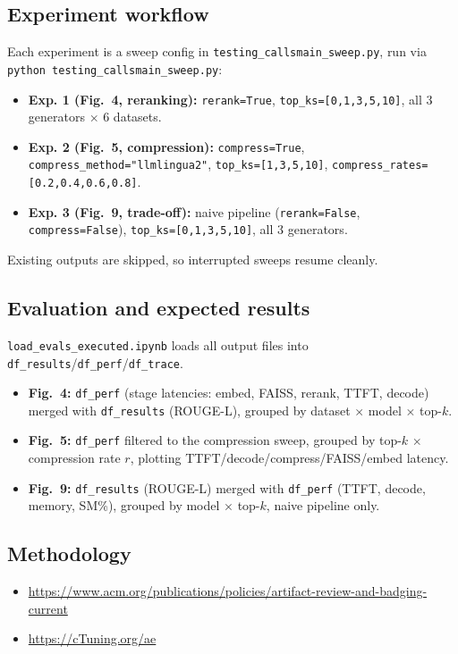 \subsection{Experiment workflow}
Each experiment is a sweep config in \texttt{testing\_callsmain\_sweep.py},
run via \texttt{python testing\_callsmain\_sweep.py}:

\begin{itemize}
  \item {\bf Exp. 1 (Fig.~4, reranking): } \texttt{rerank=True}, \texttt{top\_ks=[0,1,3,5,10]}, all 3 generators $\times$ 6 datasets.
  \item {\bf Exp. 2 (Fig.~5, compression): } \texttt{compress=True}, \texttt{compress\_method="llmlingua2"}, \texttt{top\_ks=[1,3,5,10]}, \texttt{compress\_rates=[0.2,0.4,0.6,0.8]}.
  \item {\bf Exp. 3 (Fig.~9, trade-off): } naive pipeline (\texttt{rerank=False}, \texttt{compress=False}), \texttt{top\_ks=[0,1,3,5,10]}, all 3 generators.
\end{itemize}

Existing outputs are skipped, so interrupted sweeps resume cleanly.

\subsection{Evaluation and expected results}
\texttt{load\_evals\_executed.ipynb} loads all output files into
\texttt{df\_results}/\texttt{df\_perf}/\texttt{df\_trace}.

\begin{itemize}
  \item {\bf Fig.~4: } \texttt{df\_perf} (stage latencies: embed, FAISS, rerank, TTFT, decode) merged with \texttt{df\_results} (ROUGE-L), grouped by dataset $\times$ model $\times$ top-$k$.
  \item {\bf Fig.~5: } \texttt{df\_perf} filtered to the compression sweep, grouped by top-$k$ $\times$ compression rate $r$, plotting TTFT/decode/compress/FAISS/embed latency.
  \item {\bf Fig.~9: } \texttt{df\_results} (ROUGE-L) merged with \texttt{df\_perf} (TTFT, decode, memory, SM\%), grouped by model $\times$ top-$k$, naive pipeline only.
\end{itemize}



\subsection{Methodology}
\begin{itemize}
  \item \url{https://www.acm.org/publications/policies/artifact-review-and-badging-current}
  \item \url{https://cTuning.org/ae}
\end{itemize}
